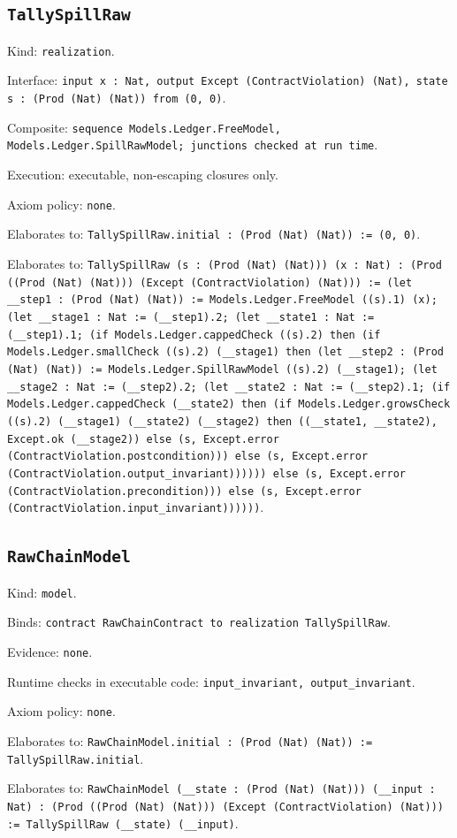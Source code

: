 \documentclass[11pt]{article}
\begin{document}
\subsection*{\texttt{TallySpillRaw}}
\noindent Kind: \texttt{realization}.\par
\noindent Interface: \texttt{input x : Nat, output Except (ContractViolation) (Nat), state s : (Prod (Nat) (Nat)) from (0, 0)}.\par
\noindent Composite: \texttt{sequence Models.Ledger.FreeModel, Models.Ledger.SpillRawModel; junctions checked at run time}.\par
\noindent Execution: executable, non-escaping closures only.\par
\noindent Axiom policy: \texttt{none}.\par
\noindent Elaborates to: \texttt{TallySpillRaw.initial : (Prod (Nat) (Nat)) := (0, 0)}.\par
\noindent Elaborates to: \texttt{TallySpillRaw (s : (Prod (Nat) (Nat))) (x : Nat) : (Prod ((Prod (Nat) (Nat))) (Except (ContractViolation) (Nat))) := (let \_\_step1 : (Prod (Nat) (Nat)) := Models.Ledger.FreeModel ((s).1) (x); (let \_\_stage1 : Nat := (\_\_step1).2; (let \_\_state1 : Nat := (\_\_step1).1; (if Models.Ledger.cappedCheck ((s).2) then (if Models.Ledger.smallCheck ((s).2) (\_\_stage1) then (let \_\_step2 : (Prod (Nat) (Nat)) := Models.Ledger.SpillRawModel ((s).2) (\_\_stage1); (let \_\_stage2 : Nat := (\_\_step2).2; (let \_\_state2 : Nat := (\_\_step2).1; (if Models.Ledger.cappedCheck (\_\_state2) then (if Models.Ledger.growsCheck ((s).2) (\_\_stage1) (\_\_state2) (\_\_stage2) then ((\_\_state1, \_\_state2), Except.ok (\_\_stage2)) else (s, Except.error (ContractViolation.postcondition))) else (s, Except.error (ContractViolation.output\_invariant)))))) else (s, Except.error (ContractViolation.precondition))) else (s, Except.error (ContractViolation.input\_invariant))))))}.\par
\subsection*{\texttt{RawChainModel}}
\noindent Kind: \texttt{model}.\par
\noindent Binds: \texttt{contract RawChainContract to realization TallySpillRaw}.\par
\noindent Evidence: \texttt{none}.\par
\noindent Runtime checks in executable code: \texttt{input\_invariant, output\_invariant}.\par
\noindent Axiom policy: \texttt{none}.\par
\noindent Elaborates to: \texttt{RawChainModel.initial : (Prod (Nat) (Nat)) := TallySpillRaw.initial}.\par
\noindent Elaborates to: \texttt{RawChainModel (\_\_state : (Prod (Nat) (Nat))) (\_\_input : Nat) : (Prod ((Prod (Nat) (Nat))) (Except (ContractViolation) (Nat))) := TallySpillRaw (\_\_state) (\_\_input)}.\par
\end{document}
